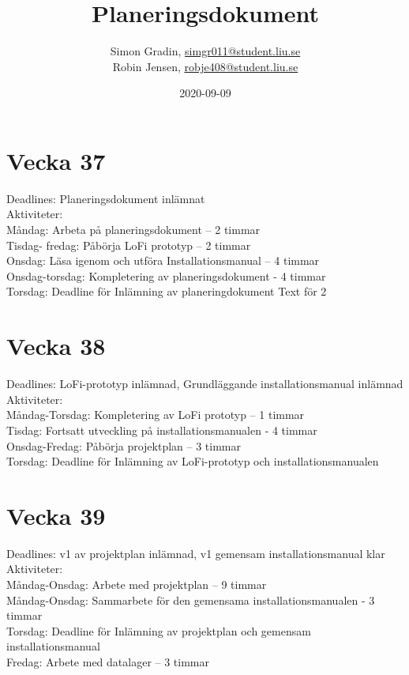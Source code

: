 \documentclass{TDP003mall}
\author{Simon Gradin, \url{simgr011@student.liu.se}\\
  Robin Jensen, \url{robje408@student.liu.se}}
\title{Planeringsdokument}
\date{2020-09-09}
\begin{document}
\projectpage

\section*{Vecka 37}

Deadlines: Planeringsdokument inlämnat \\

Aktiviteter:  \\
Måndag: Arbeta på planeringsdokument – 2 timmar  \\
Tisdag- fredag: Påbörja LoFi prototyp – 2 timmar  \\
Onsdag: Läsa igenom och utföra Installationsmanual – 4 timmar  \\
Onsdag-torsdag: Kompletering av planeringsdokument - 4 timmar  \\
{\color{red}Torsdag:} Deadline för Inlämning av planeringdokument Text för 2 \\

\section*{Vecka 38}

Deadlines: LoFi-prototyp inlämnad, Grundläggande installationsmanual inlämnad \\

Aktiviteter: \\
Måndag-Torsdag: Kompletering av LoFi prototyp – 1 timmar\\
Tisdag: Fortsatt utveckling på installationsmanualen - 4 timmar\\
Onsdag-Fredag: Påbörja projektplan – 3 timmar\\
{\color{red}Torsdag:} Deadline för Inlämning av LoFi-prototyp och installationsmanualen\\


\section*{Vecka 39}

Deadlines: v1 av projektplan inlämnad, v1 gemensam installationsmanual klar\\

Aktiviteter: \\
Måndag-Onsdag: Arbete med projektplan – 9 timmar\\
Måndag-Onsdag: Sammarbete för den gemensama installationsmanualen - 3 timmar\\
{\color{red}Torsdag:} Deadline för Inlämning av projektplan och gemensam installationsmanual\\
Fredag: Arbete med datalager – 3 timmar\\
\end{document}
